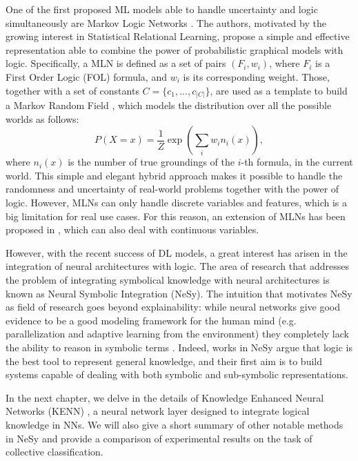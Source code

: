 One of the first proposed ML models able to handle uncertainty and logic simultaneously are Markov Logic Networks \cite{richardson2006markov}. The authors, motivated by the growing interest in Statistical Relational Learning, propose a simple and effective representation able to combine the power of probabilistic graphical models with logic.
Specifically, a MLN is defined as a set of pairs $(F_i, w_i)$, where $F_i$ is a First Order Logic (FOL) formula, and $w_i$ is its corresponding weight. Those, together with a set of constants $C=\{c_1,\dots,c_{|C|}\}$, are used as a template to build a Markov Random Field \cite{pearl2014probabilistic}, which models the distribution over all the possible worlds as follows:
\begin{equation*}
P(X=x)=\frac{1}{Z} \exp \left(\sum_{i} w_{i} n_{i}(x)\right),
\end{equation*}
where $n_i(x)$ is the number of true groundings of the $i$-th formula, in the current world. 
This simple and elegant hybrid approach makes it possible to handle the randomness and uncertainty of real-world problems together with the power of logic. However, MLNs can only handle discrete variables and features, which is a big limitation for real use cases. For this reason, an extension of MLNs has been proposed in \cite{wang2008hybrid}, which can also deal with continuous variables.

However, with the recent success of DL models, a great interest has arisen in the integration of neural architectures with logic. The area of research that addresses the problem of integrating symbolical knowledge with neural architectures is known as Neural Symbolic Integration (NeSy). The intuition that motivates NeSy as field of research goes beyond explainability: while neural networks give good evidence to be a good modeling framework for the human mind (e.g. parallelization and adaptive learning from the environment) they completely lack the ability to reason in symbolic terms \cite{Besold2017NeuralSymbolicLA}. Indeed, works in NeSy argue that logic is the best tool to represent general knowledge, and their first aim is to build systems capable of dealing with both symbolic and sub-symbolic representations.

In the next chapter, we delve in the details of Knowledge Enhanced Neural Networks (KENN) \cite{daniele2019kenn}, a neural network layer designed to integrate logical knowledge in NNs. We will also give a short summary of other notable methods in NeSy and provide a comparison of experimental results on the task of collective classification.




